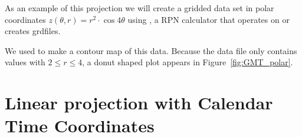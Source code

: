 As an example of this projection we will create a gridded data set
in polar coordinates $z(\theta, r) = r^2 \cdot \cos{4\theta}$
using , a RPN calculator that operates on or
creates grdfiles.

 

We used  to make a contour map of this data.  Because
the data file only contains values with $2 \leq r \leq 4$, a donut
shaped plot appears in Figure~\ref{fig:GMT_polar}.\

\section{Linear projection with Calendar Time Coordinates}
\label{sec:time}



